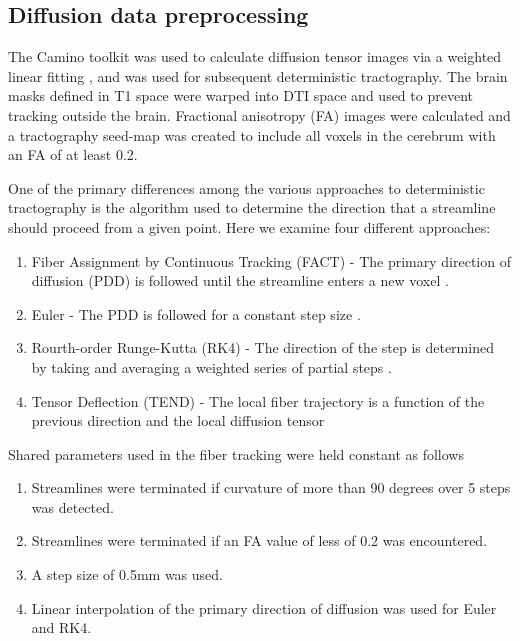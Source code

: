 \documentclass{frontiersSCNS} %
\begin{document}
\subsection{Diffusion data preprocessing}
The Camino toolkit \citep{Cook2006} was used to calculate diffusion tensor images via a
weighted linear fitting \citep{Basser1994c,Salvador2005b}, and was 
used for subsequent deterministic tractography. The brain masks defined
in T1 space were warped into DTI space and used to prevent tracking outside the brain. 
Fractional anisotropy (FA) images were calculated and a
tractography seed-map was created to include all voxels in the cerebrum with an FA of at
least 0.2. 

One of the primary differences among the various approaches to
deterministic tractography is the algorithm used to determine the
direction that a streamline should proceed from a given point. Here we
examine four different approaches:

\begin{enumerate}
\item Fiber Assignment by Continuous Tracking (FACT) - The primary
  direction of diffusion (PDD) is followed until the streamline enters
  a new voxel \citep{Xue1999}.
\item Euler -  The PDD is followed for a constant step size \citep{Basser2000}.
\item Rourth-order Runge-Kutta (RK4) - The direction of the step is determined
 by taking and averaging a weighted series of partial steps \citep{Basser2000}.
\item Tensor Deflection (TEND) - The local fiber trajectory is a function of the previous
direction and the local diffusion tensor \citep{Lazar2003}
\end{enumerate}

Shared parameters used in the fiber tracking were held constant as follows
\begin{enumerate}
\item Streamlines were terminated if curvature of more than 90 degrees over 5 steps was detected. 
\item Streamlines were terminated if an FA value of less of 0.2 was encountered. 
\item A step size of 0.5mm was used. 
\item Linear interpolation of the primary direction of diffusion was used for Euler and RK4. 
\end{enumerate}

\end{document}
